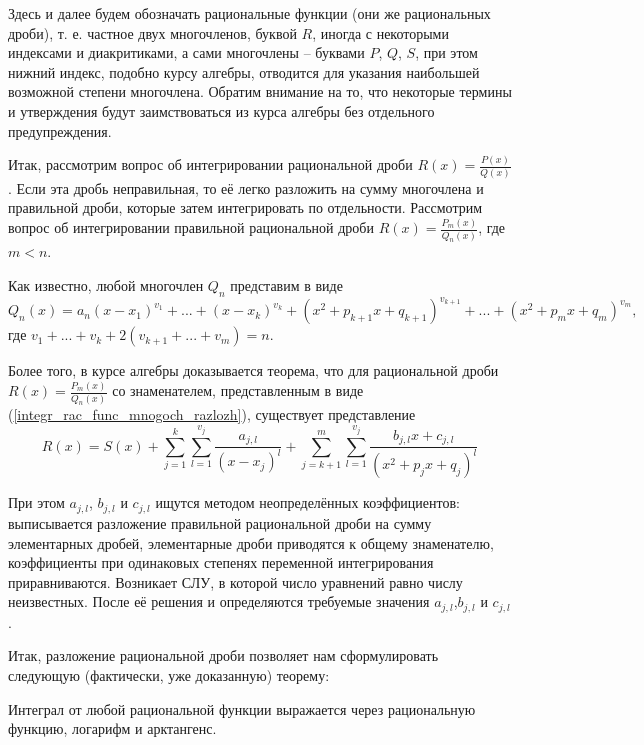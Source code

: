 Здесь и далее будем обозначать рациональные функции (они же рациональных дроби), т. е. частное двух многочленов, буквой $R$, иногда с некоторыми индексами и диакритиками, а сами многочлены -- буквами $P$, $Q$, $S$, при этом нижний индекс, подобно курсу алгебры, отводится для указания наибольшей возможной степени многочлена. Обратим внимание на то, что некоторые термины и утверждения будут заимствоваться из курса алгебры без отдельного предупреждения.

Итак, рассмотрим вопрос об интегрировании рациональной дроби $R(x)=\frac{P(x)}{Q(x)}$.
Если эта дробь неправильная, то её легко разложить на сумму многочлена и правильной дроби, которые затем интегрировать по отдельности.
Рассмотрим вопрос об интегрировании правильной рациональной дроби ${ R(x)=\frac{P_m(x)}{Q_n(x)} }$, где $m<n$.

Как известно, любой многочлен $Q_n$ представим в виде
\begin{equation}\label{integr_rac_func_mnogoch_razlozh}
Q_n(x)=a_n(x-x_1)^{v_1}+...+(x-x_k)^{v_k}+(x^2+p_{k+1}x+q_{k+1})^{v_{k+1}}+...+(x^2+p_m x+q_m)^{v_m}
,\end{equation}
где $v_1+...+v_k + 2(v_{k+1}+...+v_m)=n$.

Более того, в курсе алгебры доказывается теорема, что для рациональной дроби $R(x)=\frac{P_m(x)}{Q_n(x)}$ со знаменателем, представленным в виде (\ref{integr_rac_func_mnogoch_razlozh}), существует представление
$$
R(x)=S(x)+\sum_{j=1}^k\sum_{l=1}^{v_j}\frac{a_{j,l}}{(x-x_j)^l}+\sum_{j=k+1}^m\sum_{l=1}^{v_j}\frac{b_{j,l}x+c_{j,l}}{(x^2+p_j x + q_j)^l}
$$

При этом $a_{j,l}$, $b_{j,l}$ и $c_{j,l}$ ищутся методом неопределённых коэффициентов: выписывается разложение правильной рациональной дроби на сумму элементарных дробей, элементарные дроби приводятся к общему знаменателю, коэффициенты при одинаковых степенях переменной интегрирования приравниваются. Возникает СЛУ, в которой число уравнений равно числу неизвестных. После её решения и определяются требуемые значения $a_{j,l}$,$b_{j,l}$ и $c_{j,l}$.

Итак, разложение рациональной дроби позволяет нам сформулировать следующую (фактически, уже доказанную) теорему:

\begin{teorema}
Интеграл от любой рациональной функции выражается через рациональную функцию, логарифм и арктангенс.
\end{teorema}
